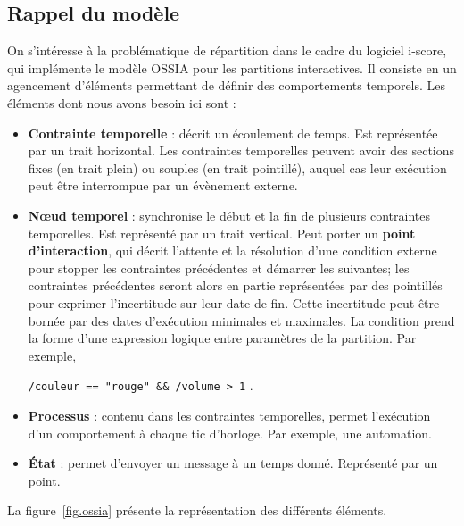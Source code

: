 \documentclass[10pt]{article}
\newcommand\ossia{OSSIA\xspace}
\newcommand\vocab[1]{\textbf{#1}}
\begin{document}
\subsection{Rappel du modèle}\label{sec.rappel-ossia}
On s'intéresse à la problématique de répartition dans le cadre du logiciel i-score, qui implémente le modèle \ossia\cite{celerier2015ossia} pour les partitions interactives.
Il consiste en un agencement d'éléments permettant de définir des comportements temporels. 
Les éléments dont nous avons besoin ici sont : 
\begin{itemize}
	\item \vocab{Contrainte temporelle} : décrit un écoulement de temps. 
    Est représentée par un trait horizontal. Les contraintes temporelles peuvent avoir des sections fixes (en trait plein) ou souples (en trait pointillé), auquel cas leur exécution peut être interrompue par un évènement externe.
	\item \vocab{Nœud temporel} : synchronise le début et la fin de plusieurs contraintes temporelles. Est représenté par un trait vertical.
	Peut porter un \vocab{point d'interaction}, qui décrit l'attente et la résolution d'une condition externe pour stopper les contraintes précédentes et démarrer les suivantes; les contraintes précédentes seront alors en partie représentées par des pointillés pour exprimer l'incertitude sur leur date de fin. 
    Cette incertitude peut être bornée par des dates d'exécution minimales et maximales.
    La condition prend la forme d'une expression logique entre paramètres de la partition. Par exemple, 
    
    \lstinline|/couleur == "rouge" && /volume > 1| .
	\item \vocab{Processus} : contenu dans les contraintes temporelles, permet l'exécution d'un comportement à chaque tic d'horloge. Par exemple, une automation.
	\item \vocab{État} : permet d'envoyer un message à un temps donné. Représenté par un point.
\end{itemize}
La figure~\ref{fig.ossia} présente la représentation des différents éléments.
\end{document}
